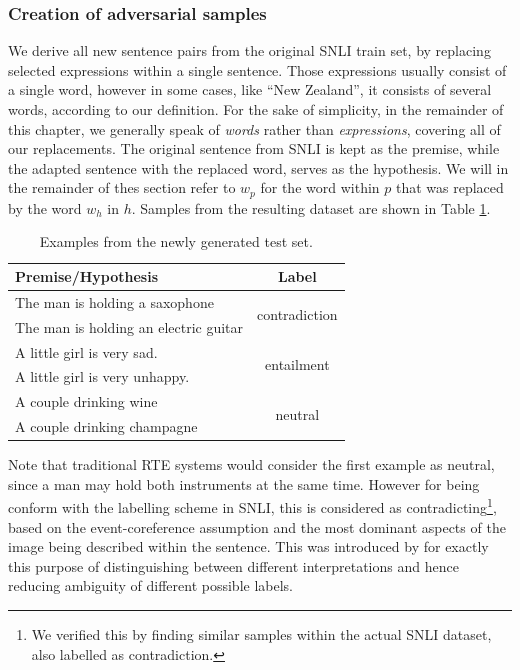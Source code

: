 \subsubsection{Creation of adversarial samples}
We derive all new sentence pairs from the original \ac{SNLI} train set, by replacing selected expressions within a single sentence. Those expressions usually consist of a single word, however in some cases, like ``New Zealand'', it consists of several words, according to our definition. For the sake of simplicity, in the remainder of this chapter, we generally speak of \textit{words} rather than \textit{expressions}, covering all of our replacements. The original sentence from \ac{SNLI} is kept as the premise, while the adapted sentence with the replaced word, serves as the hypothesis. We will in the remainder of thes section refer to $w_p$ for the word within $p$ that was replaced by the word $w_h$ in $h$. Samples from the resulting dataset are shown in Table \ref{tab:new_testset_samples}.
\begin{table}[htt]
\centering
\begin{tabular}{lc}
\toprule
	\textbf{Premise/Hypothesis} & \textbf{Label} \\  \midrule
		The man is holding a saxophone & \multirow{2}{*}{contradiction} \\
        The man is holding an electric guitar & \\
        \midrule
		A little girl is very sad. & \multirow{2}{*}{entailment} \\ 
        A little girl is very unhappy.&  \\
        \midrule
		A couple drinking wine & \multirow{2}{*}{neutral} \\
        A couple drinking champagne &  \\
    \bottomrule
  \end{tabular}
  \caption{Examples from the newly generated test set.}
    \label{tab:new_testset_samples}
\end{table}
Note that traditional \ac{RTE} systems would consider the first example as neutral, since a man may hold both instruments at the same time. However for being conform with the labelling scheme in \ac{SNLI}, this is considered as contradicting\footnote{We verified this by finding similar samples within the actual \ac{SNLI} dataset, also labelled as contradiction.}, based on the event-coreference assumption and the most dominant aspects of the image being  described within the sentence. This was introduced by \cite{bowman2015large} for exactly this purpose of distinguishing between different interpretations and hence reducing ambiguity of different possible labels.

